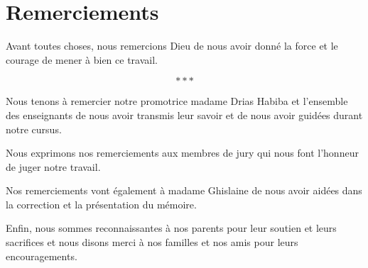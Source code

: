 \begin{titlepage}
	\itshape
	\centering
	\large
	
	\vspace*{\fill}
	\begin{minipage}{0.75\textwidth}
	
	\section*{\LARGE Remerciements}
	
	\bigskip
	
	Avant toutes choses, nous remercions Dieu de nous avoir donné la force et le courage de mener à bien ce travail.	
	
	\vspace{-1.5em}
	$$***$$
	
	Nous tenons à remercier notre promotrice madame Drias Habiba et l'ensemble des enseignants de nous avoir transmis leur savoir et de nous avoir guidées durant notre cursus.
	
	\bigskip
	
	Nous exprimons nos remerciements aux membres de jury qui nous font l'honneur de juger notre travail.
	
	\bigskip
	
	Nos remerciements vont également à madame Ghislaine de nous avoir aidées dans la correction et la présentation du mémoire.
	
	\bigskip
	
	Enfin, nous sommes reconnaissantes à nos parents pour leur soutien et leurs sacrifices et nous disons merci à nos familles et nos amis pour leurs encouragements.
	
	
	\end{minipage}

	\vspace*{\fill}
	
\end{titlepage}

